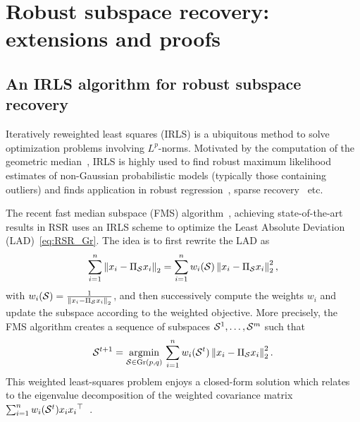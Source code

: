 \section{Robust subspace recovery: extensions and proofs}\label{app:RSR}

\subsection{An IRLS algorithm for robust subspace recovery}
Iteratively reweighted least squares (IRLS) is a ubiquitous method to solve optimization problems involving $L^p$-norms. Motivated by the computation of the geometric median~\citep{weiszfeld_sur_1937}, IRLS is highly used to find robust maximum likelihood estimates of non-Gaussian probabilistic models (typically those containing outliers) and finds application in robust regression~\citep{huber_robust_1964}, sparse recovery~\citep{daubechies_iteratively_2010} etc.

The recent fast median subspace (FMS) algorithm~\citep{lerman_fast_2018}, achieving state-of-the-art results in RSR uses an IRLS scheme to optimize the Least Absolute Deviation (LAD)~\eqref{eq:RSR_Gr}.
The idea is to first rewrite the LAD as 
\begin{equation}
	\sum_{i=1}^n \norm{x_i - \Pi_{\S} x_i}_2 = \sum_{i=1}^n w_i(\S) \norm{x_i - \Pi_{\S} x_i}_2^2,
\end{equation}
with $w_i(\S) = \frac{1}{\norm{x_i - \Pi_{\S} x_i}_2}$, and then successively compute the weights $w_i$ and update the subspace according to the weighted objective.
More precisely, the FMS algorithm creates a sequence of subspaces $\S^1, \dots, \S^m$ such that 
\begin{equation}\label{eq:IRLS_FMF}
    \S^{t+1} = \argmin{\S \in \Gr(p, q)} \sum_{i=1}^n w_i(\S^t) \norm{x_i - \Pi_\S x_i}_2^2.
\end{equation}
This weighted least-squares problem enjoys a closed-form solution which relates to the eigenvalue decomposition of the weighted covariance matrix $\sum_{i=1}^n w_i(\S^t) x_i {x_i}\T$~\citep[Chapter~3.3]{vidal_generalized_2016}.

